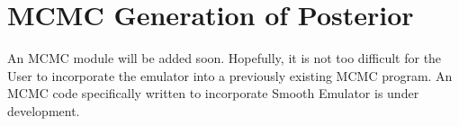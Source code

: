\documentclass[main.tex]{subfiles}
\begin{document}
\setcounter{section}{5}
\section{MCMC Generation of Posterior}\label{sec:mcmc}

An MCMC module will be added soon. Hopefully, it is not too difficult for the User to incorporate the emulator into a previously existing MCMC program. An MCMC code specifically written to incorporate Smooth Emulator is under development.
\end{document}
